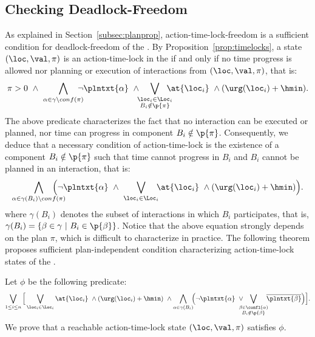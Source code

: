 \subsection{Checking Deadlock-Freedom}
As explained in Section~\ref{subsec:planprop}, action-time-lock-freedom is a sufficient condition for deadlock-freedom of the \lpsabrb.
By Proposition~\ref{prop:timelocks}, a state $(\loc,\val,\pi)$ is an action-time-lock in the \lps if and only if 
no time progress is allowed nor planning or execution of interactions from $(\loc,\val,\pi)$, that is:
\begin{displaymath}
  \pi>0 \ \wedge \ \bigwedge_{\alpha \in \gamma \setminus conf(\pi)} \hspace*{-2ex} \neg\plntxt{\alpha} \ \wedge
  \hspace*{-1ex} \bigvee_{\substack{\loc_i \in \Loc_i \\ B_i \notin \p{\pi}}} \hspace*{-2ex} \at{\loc_i} \ \wedge(\urg(\loc_i) + \hmin).
\end{displaymath}
The above predicate characterizes the fact that no interaction can be executed or planned, nor time can progress in component $B_i \notin \p{\pi}$.
Consequently, we deduce that a necessary condition of action-time-lock is the existence of a component $B_i \notin \p{\pi}$ such that time cannot progress in $B_i$ and $B_i$ cannot be planned in an interaction, that is:
\begin{displaymath}
  \bigwedge_{\substack{\alpha \in \gamma(B_i) \setminus conf(\pi)}} \hspace*{-4ex} \Big(\neg\plntxt{\alpha} \ \wedge \ \bigvee_{\loc_i \in \Loc_i} \hspace*{-1ex} \at{\loc_i} \ \wedge(\urg(\loc_i) + \hmin)\Big).
\end{displaymath}
where $\gamma(B_i)$ denotes the subset of interactions in which $B_i$ participates, that is, $\gamma(B_i) = \{ \beta \in \gamma \ | \ B_i \in \p{\beta} \}$.
Notice that the above equation strongly depends on the plan $\pi$, which is difficult to characterize in practice.
The following theorem proposes sufficient plan-independent condition characterizing action-time-lock states of the \lpsabrb.
\begin{theorem}\label{thm:dla}
  Let $\phi$ be the following predicate:
\begin{displaymath}
  \bigvee_{1\le i\le n}\Big[\bigvee_{\loc_i \in \Loc_i}\at{\loc_i}\ \wedge(\urg(\loc_i)+\hmin) \ \wedge\bigwedge_{\alpha \in \gamma(B_i)}\hspace*{-1ex}\Big(  \neg\plntxt{\alpha} \
  \vee\hspace*{-2ex}\bigvee_{\substack{\beta\in\confl(\alpha)\\B_i\notin\p{\beta}}}\hspace*{-1ex}\overline{\plntxt{\beta}} \Big)\Big].
\end{displaymath}
We prove that a reachable action-time-lock state $(\loc,\val,\pi)$ satisfies $\phi$.
\end{theorem}
